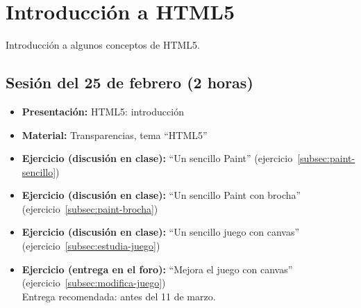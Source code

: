 \documentclass[a4paper,12pt]{report}
\begin{document}
\section{Introducción a HTML5}

Introducción a algunos conceptos de HTML5.

\subsection{Sesión del 25 de febrero (2 horas)}

\begin{itemize}
 \item \textbf{Presentación:} HTML5: introducción
 \item \textbf{Material:} Transparencias, tema ``HTML5''


 \item \textbf{Ejercicio (discusión en clase):} ``Un sencillo Paint'' (ejercicio~\ref{subsec:paint-sencillo})
 \item \textbf{Ejercicio (discusión en clase):} ``Un sencillo Paint con brocha'' (ejercicio~\ref{subsec:paint-brocha}) \\
 \item \textbf{Ejercicio (discusión en clase):} ``Un sencillo juego con canvas'' (ejercicio~\ref{subsec:estudia-juego})
 \item \textbf{Ejercicio (entrega en el foro):} ``Mejora el juego con canvas'' (ejercicio~\ref{subsec:modifica-juego}) \\
Entrega recomendada: antes del 11 de marzo.
\end{itemize}
\end{document}
